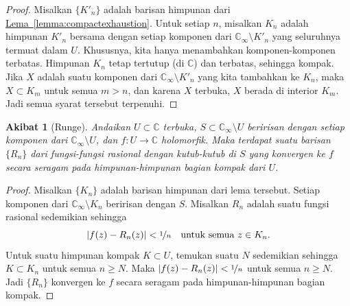 \documentclass[12pt,openany]{book}
\newcommand{\abs}[1]{\left\lvert {#1} \right\rvert}
\newcommand{\C}{{\mathbb{C}}}
\theoremstyle{plain}
\newtheorem{cor}[thm]{Akibat}
\theoremstyle{remark}
\theoremstyle{definition}
\theoremstyle{exercise}
\theoremstyle{example}
\newcommand{\lemmaref}[1]{\hyperref[#1]{Lema~\ref*{#1}}}
\begin{document}
\begin{proof}
Misalkan $\{ K'_n \}$ adalah barisan himpunan dari
\lemmaref{lemma:compactexhaustion}.
Untuk setiap $n$, misalkan $K_n$ adalah himpunan $K'_n$ bersama dengan setiap 
komponen dari $\C_\infty \setminus K'_n$ yang seluruhnya termuat dalam $U$.
Khususnya, kita hanya menambahkan komponen-komponen terbatas.
Himpunan $K_n$ tetap tertutup (di $\C$) dan terbatas, sehingga kompak.
Jika $X$ adalah suatu komponen dari $\C_\infty \setminus K'_n$ yang kita tambahkan ke
$K_n$, maka $X \subset K_{m}$ untuk semua $m > n$, dan karena $X$ terbuka,
$X$ berada di interior $K_{m}$.  Jadi semua syarat tersebut 
terpenuhi.
\end{proof}

\begin{cor}[Runge]
\label{cor:rungeseq}
Andaikan $U \subset \C$ terbuka, $S \subset \C_{\infty} \setminus U$
beririsan dengan setiap komponen dari $\C_\infty \setminus U$,
dan $f \colon U \to \C$ holomorfik.
Maka terdapat suatu barisan $\{ R_n \}$ dari fungsi-fungsi rasional dengan kutub-kutub di $S$
yang konvergen ke $f$ secara seragam pada himpunan-himpunan bagian kompak dari $U$.
\end{cor}

\begin{proof}
Misalkan $\{ K_n \}$ adalah barisan himpunan dari lema tersebut.
Setiap komponen dari $\C_\infty \setminus K_n$ beririsan dengan $S$.
Misalkan $R_n$ adalah suatu fungsi rasional sedemikian sehingga
\begin{equation*}
\abs{f(z)-R_n(z)} < \nicefrac{1}{n}
\quad
\text{untuk semua } z \in K_n .
\end{equation*}
Untuk suatu himpunan kompak $K \subset U$, temukan suatu $N$ sedemikian sehingga $K \subset K_n$ untuk
semua $n \geq N$.  Maka $\abs{f(z)-R_n(z)} < \nicefrac{1}{n}$ untuk semua
$n \geq N$. Jadi $\{ R_n \}$ konvergen ke $f$ secara seragam pada himpunan-himpunan bagian kompak.
\end{proof}
\end{document}
